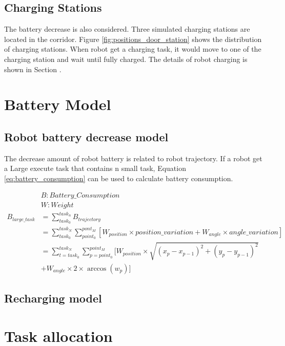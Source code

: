 \subsection{Charging Stations}
The battery decrease is also considered. Three simulated charging stations are located in the corridor. Figure \ref{fig:positions_door_station} shows the distribution of charging stations. 
When robot get a charging task, it would move to one of the charging station and wait until fully charged. The details of robot charging is shown in Section .

\section{Battery Model}
\label{section:battery_model}

\subsection{Robot battery decrease model}
The decrease amount of robot battery is related to robot trajectory. If a robot get a Large execute task that contains n small task, Equation \ref{eq:battery_consumption} can be used to calculate battery consumption.

\begin{equation}
\begin{aligned}
\label{eq:battery_consumption}
&B: Battery\_Consumption\\
&W: Weight \\
B_{large\_task} & = \sum_{task_0}^{task_n} B_{trajectory} \\
& = \sum_{task_0}^{task_N} \sum_{point_0}^{pont_M} [W_{position} \times position\_variation+W_{angle}  \times angle\_variation]\\
& = \sum_{t = task_0}^{task_N} \sum_{p = point_0}^{point_M} [ W_{position} \times \sqrt{(x_p-x_{p-1} )^2+(y_p-y_{p-1} )^2} \\
&   + W_{angle} \times 2 \times \arccos(w_p)] 
\end{aligned}
\end{equation}

		
\subsection{Recharging model}



\section{Task allocation}

